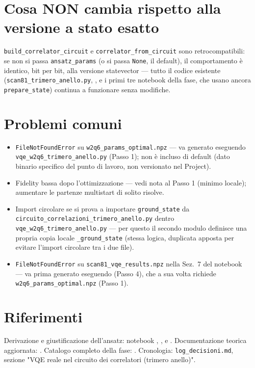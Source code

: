 \documentclass[11pt,a4paper]{article}
\begin{document}
\section*{Cosa NON cambia rispetto alla versione a stato esatto}

\texttt{build\_correlator\_circuit} e \texttt{correlator\_from\_circuit} sono
retrocompatibili: se non si passa \texttt{ansatz\_params} (o si passa
\texttt{None}, il default), il comportamento è identico, bit per bit, alla
versione statevector --- tutto il codice esistente
(\texttt{scan81\_trimero\_anello.py}, \texttt{},
e i primi tre notebook della fase, che usano ancora \texttt{prepare\_state})
continua a funzionare senza modifiche.

\section*{Problemi comuni}

\begin{itemize}
\item \texttt{FileNotFoundError} su \texttt{w2q6\_params\_optimal.npz} ---
va generato eseguendo \texttt{vqe\_w2q6\_trimero\_anello.py} (Passo 1); non è
incluso di default (dato binario specifico del punto di lavoro, non versionato
nel Project).
\item Fidelity bassa dopo l'ottimizzazione --- vedi nota al Passo 1
(minimo locale); aumentare le partenze multistart di solito risolve.
\item Import circolare se si prova a importare \texttt{ground\_state} da
\texttt{circuito\_correlazioni\_trimero\_anello.py} dentro
\texttt{vqe\_w2q6\_trimero\_anello.py} --- per questo il secondo modulo
definisce una propria copia locale \texttt{\_ground\_state} (stessa logica,
duplicata apposta per evitare l'import circolare tra i due file).
\item \texttt{FileNotFoundError} su \texttt{scan81\_vqe\_results.npz} nella
Sez.~7 del notebook --- va prima generato eseguendo
\texttt{} (Passo 4), che a sua volta
richiede \texttt{w2q6\_params\_optimal.npz} (Passo 1).
\end{itemize}

\section*{Riferimenti}

Derivazione e giustificazione dell'ansatz: notebook
\texttt{},
\texttt{}, e
\texttt{}. Documentazione teorica
aggiornata: \texttt{}.
Catalogo completo della fase: \texttt{}.
Cronologia: \texttt{log\_decisioni.md}, sezione "VQE reale nel circuito dei
correlatori (trimero anello)".
\end{document}
